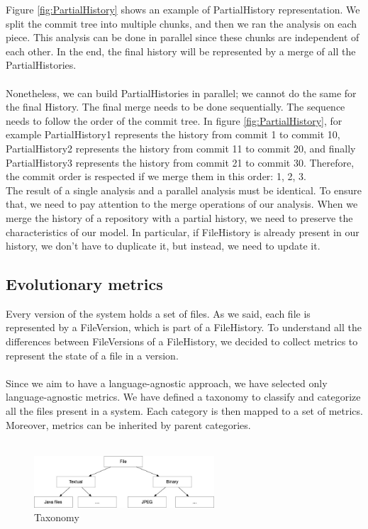 Figure \ref{fig:PartialHistory} shows an example of PartialHistory representation. 
We split the commit tree into multiple chunks, and then we ran the analysis on each piece. 
This analysis can be done in parallel since these chunks are independent of each other. 
In the end, the final history will be represented by a merge of all the PartialHistories. \\
\\
Nonetheless, we can build PartialHistories in parallel; we cannot do the same for the final History. 
The final merge needs to be done sequentially. The sequence needs to follow the order of the commit tree. 
In figure \ref{fig:PartialHistory}, for example
PartialHistory1 represents the history from commit 1 to commit 10, 
PartialHistory2 represents the history from commit 11 to commit 20, and finally 
PartialHistory3 represents the history from commit 21 to commit 30.
Therefore, the commit order is respected if we merge them in this order: 1, 2, 3. 
\\
The result of a single analysis and a parallel analysis must be identical. 
To ensure that, we need to pay attention to the merge operations of our analysis.
When we merge the history of a repository with a partial history, we need to preserve the characteristics of our model. 
In particular, if FileHistory is already present in our history, we don't have to duplicate it, but instead, we need to update it. 

\label{s:evolutionaryMetrics}
\subsection*{Evolutionary metrics}
Every version of the system holds a set of files. 
As we said, each file is represented by a FileVersion, which is part of a FileHistory. 
To understand all the differences between FileVersions of a FileHistory,
we decided to collect metrics to represent the state of a file in a version.\\
\\
Since we aim to have a language-agnostic approach, we have selected only language-agnostic metrics. 
We have defined a taxonomy to classify and categorize all the files present in a system. 
Each category is then mapped to a set of metrics. Moreover, metrics can be inherited by parent categories. \\
\\


\begin{figure}
    \center
    \includegraphics[width=0.6\textwidth]{Taxonomy.jpg}
    \caption{Taxonomy}
    \label{fig:taxonomy}
\end{figure}

